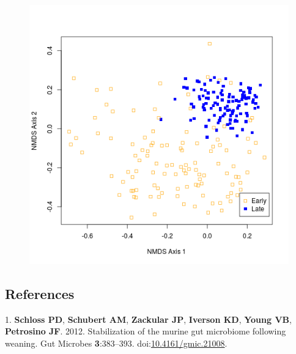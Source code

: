 \documentclass[11pt,]{article}
\begin{document}
\begin{figure}[htbp]
\centering
\includegraphics{../results/figures/nmds_figure.png}
\caption{}
\end{figure}

\newpage

\subsection*{References}\label{references}

\hypertarget{refs}{}
\hypertarget{ref-Schloss2012}{}
1. \textbf{Schloss PD}, \textbf{Schubert AM}, \textbf{Zackular JP},
\textbf{Iverson KD}, \textbf{Young VB}, \textbf{Petrosino JF}. 2012.
Stabilization of the murine gut microbiome following weaning. Gut
Microbes \textbf{3}:383--393.
doi:\href{https://doi.org/10.4161/gmic.21008}{10.4161/gmic.21008}.
\end{document}
